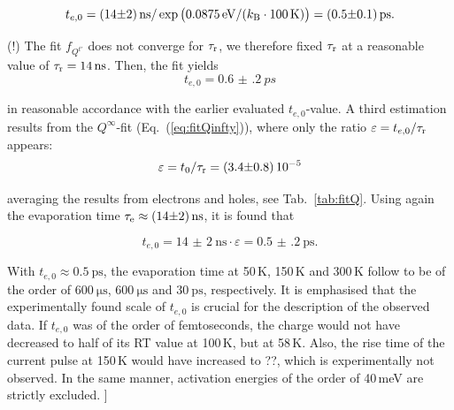 \begin{equation}
 t_{e,0} = \SI{14(2)}{\ns} / \exp{\big( \SI{0.0875}{\eV}/(\kB\cdot \SI{100}{\kelvin}) \big)} = \SI{0.5(1)}{\ps}.
\end{equation}

\noindent
(!) The fit $f_{Q^{t'}}$ does not converge for $\taurec$, we therefore fixed $\taurec$ at a reasonable value of $\taurec = \SI{14}{\ns}$. 
Then, the fit yields
\begin{equation}
 t_{e,0} = \SI{0.6(2)}{ps}
\end{equation}
 
\noindent
in reasonable accordance with the earlier evaluated $t_{e,0}$-value.  
A third estimation results from the $Q^{\infty}$-fit (Eq.~(\ref{eq:fitQinfty})), where only the ratio $\varepsilon = t_{e,0}/\taurec$ appears:
\begin{equation}
 \varepsilon = t_0/\taurec = (\num{3.4(8)})\,\num{e-5}
\end{equation} 

\noindent
averaging the results from electrons and holes, see Tab.~\ref{tab:fitQ}. 
Using again the evaporation time $\tauevap \approx \SI{14(2)}{\ns}$, it is found that

\begin{equation}
 t_{e,0} = \SI{14(2)}{\ns} \cdot \varepsilon = \SI{0.5(2)}{\ps}.
\end{equation}

\noindent
With $t_{e,0} \approx \SI{0.5}{\ps}$, the evaporation time at 50\,K, 150\,K and 300\,K follow to be of the order of $\SI{600}{\micro\second}$, $\SI{600}{\micro\second}$ and $\SI{30}{\ps}$, respectively. 
It is emphasised that the experimentally found scale of $t_{e,0}$ is crucial for the description of the observed data.
If $t_{e,0}$ was of the order of femtoseconds, the charge would not have decreased to half of its RT value at 100\,K, but at 58\,K. 
Also, the rise time of the current pulse at 150\,K would have increased to ??, which is experimentally not observed. 
In the same manner, activation energies of the order of 40\,meV are strictly excluded. 
]


